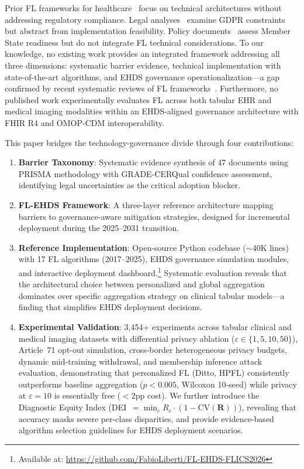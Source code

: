\documentclass[conference,a4paper]{IEEEtran}
\begin{document}
Prior FL frameworks for healthcare~\cite{rieke2020future, sheller2020federated} focus on technical architectures without addressing regulatory compliance. Legal analyses~\cite{quinn2024gdpr, staunton2024ethical, shabani2024ehds} examine GDPR constraints but abstract from implementation feasibility. Policy documents~\cite{tehdas2024ready} assess Member State readiness but do not integrate FL technical considerations. To our knowledge, no existing work provides an integrated framework addressing all three dimensions: systematic barrier evidence, technical implementation with state-of-the-art algorithms, and EHDS governance operationalization---a gap confirmed by recent systematic reviews of FL frameworks~\cite{kairouz2021advances, teo2024systematic}. Furthermore, no published work experimentally evaluates FL across both tabular EHR and medical imaging modalities within an EHDS-aligned governance architecture with FHIR R4 and OMOP-CDM interoperability.

This paper bridges the technology-governance divide through four contributions:
\begin{enumerate}
    \item \textbf{Barrier Taxonomy}: Systematic evidence synthesis of 47 documents using PRISMA methodology with GRADE-CERQual confidence assessment, identifying legal uncertainties as the critical adoption blocker.
    \item \textbf{FL-EHDS Framework}: A three-layer reference architecture mapping barriers to governance-aware mitigation strategies, designed for incremental deployment during the 2025--2031 transition.
    \item \textbf{Reference Implementation}: Open-source Python codebase ($\sim$40K lines) with 17 FL algorithms (2017--2025), EHDS governance simulation modules, and interactive deployment dashboard.\footnote{Available at: \url{https://github.com/FabioLiberti/FL-EHDS-FLICS2026}} Systematic evaluation reveals that the architectural choice between personalized and global aggregation dominates over specific aggregation strategy on clinical tabular models---a finding that simplifies EHDS deployment decisions.
    \item \textbf{Experimental Validation}: 3,454+ experiments across tabular clinical and medical imaging datasets with differential privacy ablation ($\varepsilon \in \{1, 5, 10, 50\}$), Article~71 opt-out simulation, cross-border heterogeneous privacy budgets, dynamic mid-training withdrawal, and membership inference attack evaluation, demonstrating that personalized FL (Ditto, HPFL) consistently outperforms baseline aggregation ($p < 0.005$, Wilcoxon 10-seed) while privacy at $\varepsilon{=}10$ is essentially free ($<$2pp cost). We further introduce the Diagnostic Equity Index (DEI~$= \min_c R_c \cdot (1 - \text{CV}(\mathbf{R}))$), revealing that accuracy masks severe per-class disparities, and provide evidence-based algorithm selection guidelines for EHDS deployment scenarios.
\end{enumerate}
\end{document}
